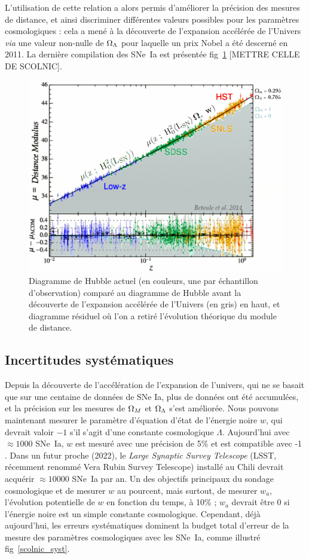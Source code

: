 \documentclass[a4paper, 12pt, svgnames]{article}
\newcommand{\mr}[1]{{\textcolor[rgb]{0.80,0.10,0.1}{#1}}}
\begin{document}
L'utilisation de cette relation a alors permis d'améliorer la précision des
mesures de distance, et ainsi discriminer différentes valeurs possibles pour les
paramètres cosmologiques : cela a mené à la découverte de l'expansion accélérée
de l'Univers \textit{via} une valeur non-nulle de $\Omega_\Lambda$ pour laquelle un prix
Nobel a été descerné en 2011. La dernière compilation des SNe~Ia est
présentée fig~\ref{hub_acc_exp} [\mr{METTRE CELLE DE SCOLNIC}].

\begin{figure}[htbp!]
    \centering
    \includegraphics[width=.5\linewidth]{Rapport_figures/bet_al_2.PNG}
    \captionsetup{justification=centering}
    \caption{Diagramme de Hubble actuel (en couleurs, une par échantillon
             d'observation) comparé au diagramme de Hubble avant la découverte 
             de l'expansion accélérée de l'Univers (en gris) en haut, et
             diagramme résiduel où l'on a retiré l'évolution théorique du module
             de distance.}
    \label{hub_acc_exp}
\end{figure}

\subsection{Incertitudes systématiques}\label{ssec:syst}

Depuis la découverte de l'accélération de l'expansion de l'univers, qui ne se
basait que sur une centaine de données de SNe Ia, plus de données ont été
accumulées, et la précision sur les mesures de $\Omega_M$ et $\Omega_\Lambda$ s'est
améliorée. Nous pouvons maintenant mesurer le paramètre d'équation d'état de
l'énergie noire $w$, qui devrait valoir $-1$ s'il s'agit d'une constante
cosmologique $\Lambda$. Aujourd'hui avec $\approx1000$ SNe~Ia, $w$ est mesuré
avec une précision de 5\% et est compatible avec -1 \cite{betoule_improved_2014,
scolnic_complete_2018}. Dans un futur proche (2022), le \textit{Large Synaptic
Survey Telescope} (LSST, récemment renommé Vera Rubin Survey Telescope) installé
au Chili devrait acquérir $\approx 10000$ SNe~Ia par an. Un des objectifs
principaux du sondage cosmologique et de mesurer $w$ au pourcent, mais surtout,
de mesurer $w_a$, l'évolution potentielle de $w$ en fonction du temps, à 10\% ;
$w_a$ devrait être 0 si l'énergie noire est un simple constante cosmologique.
Cependant, déjà aujourd'hui, les erreurs systématiques dominent la budget total
d'erreur de la mesure des paramètres cosmologiques avec les SNe~Ia, comme
illustré fig~\ref{scolnic_syst}.
\end{document}
